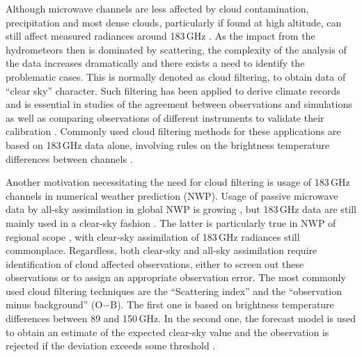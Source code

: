 \documentclass[amt, manuscript]{copernicus}
\begin{document}
Although microwave channels are less affected by cloud contamination, precipitation and most dense clouds, particularly if found at high altitude, can
still affect measured radiances around 183\,GHz
\citep[e.g.][]{bennartz2003sensitivity}. As the impact from the hydrometeors
then is dominated by scattering, the complexity of the analysis of the data
increases dramatically and there exists a need to identify the problematic
cases. This is normally denoted as cloud filtering, to obtain data of ``clear
sky'' character. Such filtering has been applied to derive climate records
\citep{lang2020new} and is essential in studies of the agreement between
observations and simulations \citep{brogniez2016review} as well as 
comparing observations of different instruments to validate their calibration
\citep{john2013assessment,moradi:retri:15,berg2016intercalibration}. Commonly
used cloud filtering methods for these applications are based on 183\,GHz data alone, involving rules on the brightness temperature differences between channels \citep{burns1997effects, buehler:aclou:07}.



Another motivation necessitating the need for cloud filtering is usage of 183\,GHz channels in 
numerical weather prediction (NWP). Usage of passive microwave data by
all-sky assimilation in global NWP is growing \citep{geer2017growing},
but 183\,GHz data are still mainly used in a clear-sky fashion
\citep{geer2018all}. The latter is particularly true in NWP of regional scope
\citep{gustafsson2018survey}, with clear-sky assimilation of 183\,GHz radiances still commonplace. Regardless, both clear-sky and all-sky assimilation require identification of cloud affected observations, either to screen out these observations or to assign an appropriate observation error. The most commonly used cloud filtering techniques are the ``Scattering index'' \citep{geer2015scatteringindex} and the ``observation minus background'' (O$-$B). The first one is based on brightness temperature differences between 89 and 150\,GHz. In the second one, the forecast model is used to obtain an estimate of the expected clear-sky value and the observation is rejected if the deviation exceeds some threshold \citep{English1999clouddetection}. 
\end{document}
